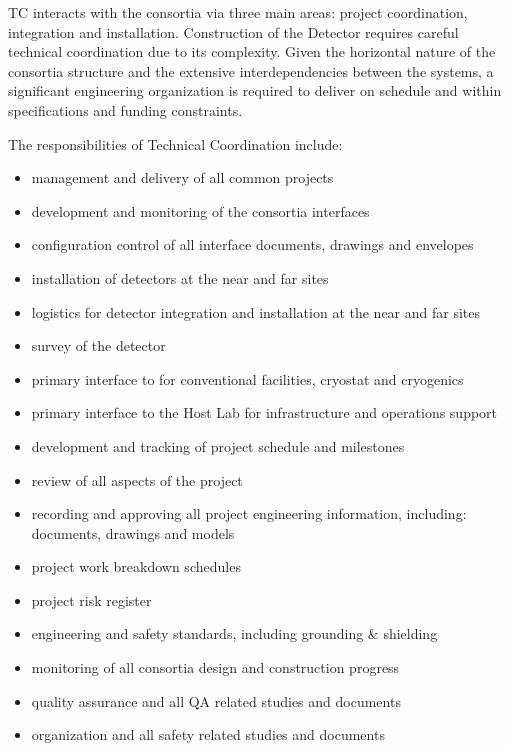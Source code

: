 TC interacts with the consortia via three main areas: project
coordination, integration and installation.  Construction of the
 Detector requires careful technical coordination due to
its complexity.  Given the horizontal nature of the consortia
structure and the extensive interdependencies between the systems, a
significant engineering organization is required to deliver
 on schedule and within specifications and funding
constraints.

The responsibilities of Technical Coordination include:
\begin{itemize}
  \item management and delivery of all common projects
  \item development and monitoring of the consortia interfaces
  \item configuration control of all interface documents, drawings and envelopes
  \item installation of detectors at the near and far sites
  \item logistics for detector integration and installation at the near and far sites
  \item survey of the detector
  \item primary interface to  for conventional facilities, cryostat and cryogenics
  \item primary interface to the Host Lab for infrastructure and operations support
  \item development and tracking of project schedule and milestones
  \item review of all aspects of the project
  \item recording and approving all project engineering information, including: documents, drawings and models
  \item project work breakdown schedules
  \item project risk register
  \item {} engineering and safety standards, including grounding \& shielding
  \item monitoring of all consortia design and construction progress
  \item quality assurance and all QA related studies and documents
  \item {} organization and all safety related studies and documents
\end {itemize}

